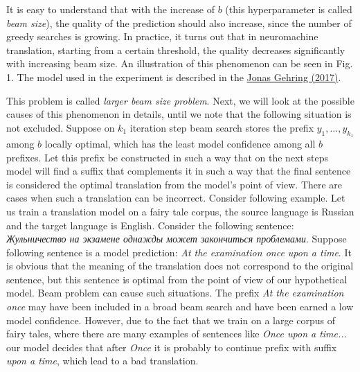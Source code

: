 \documentclass[a4paper,14pt]{extarticle}
\newcommand{\bibref}[3]{\hyperlink{#1}{#2 (#3)}}
\begin{document}
	It is easy to understand that with the increase of $b$ (this hyperparameter is called \textit{beam size}), the quality of the prediction should also increase, since the number of greedy searches is growing. In practice, it turns out that in neuromachine translation, starting from a certain threshold, the quality decreases significantly with increasing beam size. An illustration of this phenomenon can be seen in Fig. 1. The model used in the experiment is described in the  \bibref{fconv}{Jonas Gehring}{2017}. 
	
	\begin{figure}[t]
	\end{figure}
	
	This problem is called \textit{larger beam size problem}. Next, we will look at the possible causes of this phenomenon in details, until we note that the following situation is not excluded. Suppose on $k_1$ iteration step beam search stores the prefix $y_1, \dots, y_{k_1}$ among $b$ locally optimal, which has the least model confidence among all $b$ prefixes. Let this prefix be constructed in such a way that on the next steps model will find a suffix that complements it in such a way that the final sentence is considered the optimal translation from the model's point of view. There are cases when such a translation can be incorrect. Consider following example. Let us train a translation model on a fairy tale corpus, the source language is Russian and the target language is English. Consider the following sentence: \textit{Жульничество на экзамене однажды может закончиться проблемами}. Suppose following sentence is a model prediction: \textit{At the examination once upon a time}. It is obvious that the meaning of the translation does not correspond to the original sentence, but this sentence is optimal from the point of view of our hypothetical model. Beam problem can cause such situations. The prefix \textit{At the examination once} may have been included in a broad beam search and have been earned a low model confidence. However, due to the fact that we train on a large corpus of fairy tales, where there are many examples of sentences like \textit{Once upon a time...} our model decides that after \textit{Once} it is probably to continue prefix with suffix \textit{upon a time}, which lead to a bad translation.
\end{document}

